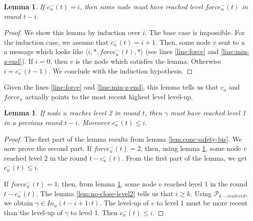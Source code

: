 \documentclass[11pt,letterpaper]{article}
\newtheorem{lem}[thm]{Lemma}
\newcommand{\cent}{\gamma}
\begin{document}
\begin{lem} \label{lem:safety-force}
	If $c_u^{-}(t) = i$, then some node must have reached level $force_u^{-}(t)$ in round $t-i$.
\end{lem}
\begin{proof}
	We show this lemma by induction over $i$.
	The base case is impossible.
	For the induction case, we assume that $c_u^{-}(t) = i+1$.
	Then, some node $v$ sent to $u$ a message which looks like $\langle i, *, force_u^{-}(t), * \rangle$ (see lines \ref{line:force} and \ref{line:min-z-end}).
	If $i = 0$, then $v$ is the node which satisfies the lemma.
	Otherwise $i = c_v^{-}(t-1)$.
	We conclude with the induction hypothesis.
\end{proof}

Given the lines \ref{line:force} and \ref{line:min-z-end}, this lemma tells us that $c_u$ and $force_u$ actually points to the most recent highest level level-up.

\begin{lem} \label{lem:ready-safety}
	If node $u$ reaches level 2 in round $t$, then $\cent$ must have reached level 1 in a previous round $t-i$.
	Moreover $c^{-}_u(t) \leq i$.
\end{lem}
\begin{proof}
	The first part of the lemma results from lemma \ref{lem:conc-safety-bis}. We now prove the second part.
	If $force_u^{-}(t) = 2$, then, using lemma \ref{lem:safety-force}, some node $v$ reached level 2 in the round $t-c_u^{-}(t)$.
	From the first part of the lemma, we get $c_u^{-}(t) \leq i$. 

	If $force_u^{-}(t) = 1$, then, from lemma \ref{lem:safety-force}, some node $v$ reached level 1 in the round $t-c_u^{-}(t)$.
	The lemma \ref{lem:no-close-level2} tells us that $i \geq k$.
	Using $\mathcal{P}_{k-centered}$, we obtain $\cent \in In_u(t-i+1:t)$.
	The level-up of $v$ to level 1 must be more recent than the level-up of $\cent$ to level 1.
	Then $c_u^{-}(t) \leq i$.
\end{proof}
\end{document}

